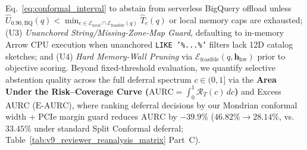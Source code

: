 \documentclass[10pt,a4paper]{article}
\begin{document}
Eq.~\eqref{eq:conformal_interval} to abstain from serverless BigQuery offload unless $\hat{U}_{0.90,\text{BQ}}(q) < \min_{e \in \mathcal{E}_{\text{local}}\cap\mathcal{E}_{\text{feasible}}(q)} \hat{T}_e(q)$ or local memory caps are exhausted; (U3) \emph{Unanchored String/Missing-Zone-Map Guard}, defaulting to in-memory Arrow CPU execution when unanchored \texttt{LIKE '\%...\%'} filters lack 12D catalog sketches; and (U4) \emph{Hard Memory-Wall Pruning} via $\mathcal{E}_{\text{feasible}}(q, \mathbf{h}_{\text{hw}})$ prior to objective scoring. Beyond fixed-threshold evaluation, we quantify selective abstention quality across the full deferral spectrum $c \in (0,1]$ via the \textbf{Area Under the Risk--Coverage Curve ($\text{AURC} = \int_0^1 \mathcal{R}_{T}(c)\,dc$)} and Excess AURC ($\text{E-AURC}$), where ranking deferral decisions by our Mondrian conformal width + PCIe margin guard reduces $\text{AURC}$ by $\mathbf{-39.9\%}$ ($46.82\% \rightarrow 28.14\%$, vs.\ $33.45\%$ under standard Split Conformal deferral; Table~\ref{tab:v9_reviewer_reanalysis_matrix} Part~C).
\end{document}
